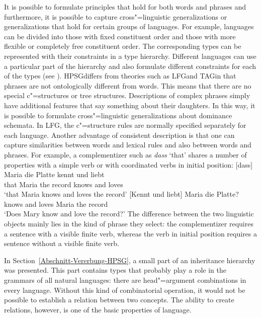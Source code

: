 It is possible to formulate principles that hold for both words and phrases and furthermore, it is possible to capture
cross"=linguistic generalizations or generalizations that hold for certain groups of languages. For example, languages can be divided
into those with fixed constituent order and those with more flexible or completely free constituent order. The corresponding types can be represented
with their constraints in a type hierarchy. Different languages can use a particular part of the hierarchy and also formulate
different constraints for each of the types (see \citealp[Section~9.2]{AW98a}).
HPSG\indexhpsg differs from theories such as LFG\indexlfg and TAG\indextag in that phrases are not
ontologically different from words. This means that there are no special c"=structures or tree structures. Descriptions of complex phrases simply have additional
features that say something about their daughters. In this way, it is possible to formulate cross"=linguistic generalizations
about dominance schemata. In LFG, the c"=structure rules are normally specified separately for each language.
Another advantage of consistent description is that one can capture similarities between words and lexical rules and also between
words and phrases. For example, a complementizer such as \emph{dass} `that' shares a number of
properties with a simple verb or with coordinated verbs in initial position:
\eal
\ex
\gll {}[dass] Maria die Platte kennt und liebt\\
	 {}\spacebr{}that Maria the record knows and loves\\
\glt `that Maria knows and loves the record'
\ex 
\gll {}[Kennt und liebt] Maria die Platte?\\
	 {}\spacebr{}knows and loves Maria the record\\
\glt `Does Mary know and love the record?'
\zl
The difference between the two linguistic objects mainly lies in the kind of phrase they select: the complementizer requires a sentence
with a visible finite verb, whereas the verb in initial position requires a sentence without a visible finite verb.

In Section~\ref{Abschnitt-Vererbung-HPSG}, a small part of an inheritance hierarchy was
presented. This part contains types
that probably play a role in the grammars of all natural languages: there are head"=argument combinations in every language. Without this
kind of combinatorial operation, it would not be possible to establish a relation between two concepts. The ability to create relations, however, is
one of the basic properties of language.

